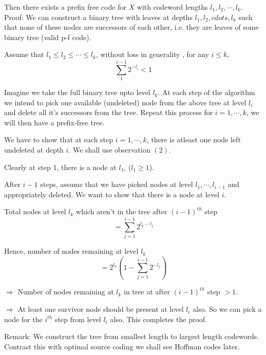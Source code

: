 \documentclass{article}
\begin{document}
 Then there exists a prefix free code for $X$ with codeword lengths $l_1 , l_2 , \cdots, l_k$.\\

 Proof: We can construct a binary tree with leaves at depths $l_1, l_2, cdots, l_k$ such that none of these nodes are successors of each other, i.e. they are leaves of some binary tree (valid p-f code).

 Assume that $l_1 \leq l_2 \leq \cdots \leq l_k$, without loss in generality    , for any $i \leq k$,
 \begin{equation}
     \sum_{1}^{i-1} 2^{-l_i} <1
 \end{equation}

Imagine we take the full binary tree upto level $l_k$. At each step of the algorithm we intend to pick one available (undeleted) node from the above tree at level $l_i$ and delete all it's successors from the tree. Repeat this process for $i=1, \cdots , k$, we will then have a prefix-free tree.

We have to show that at each step $i=1, \cdots, k$, there is atleast one node left undeleted at depth $i$. We shall use observation $(2)$.

Clearly at step 1, there is a node at $l_1$, ($l_1 \geq 1$).

After $i-1$ steps, assume that we have picked nodes at level $l_1, \cdots, l_{i-1}$ and appropriately deleted. We want to show that there is a node at level $i$.

Total nodes at level $l_k$ which aren't in the tree after $(i-1)^{th}$ step
$$ = \sum_{j=1}^{i-1} 2^{l_k -l_j}$$

Hence, number of nodes remaining at level $l_k$
$$ = 2^{l_k}(1- \sum_{j=1}^{i-1}2^{-l_j})$$

$\Rightarrow$ Number of nodes remaining at $l_k$ in tree at after $(i-1)^{th}$ step $>1$.

$\Rightarrow$ At least one  survivor node should be present at level $l_i$ also. So we can pick a node for the $i^{th}$ step from level $l_i$ also. This completes the proof.

Remark: We construct the tree from smallest length to largest length codewords. Contrast this with optimal source coding we shall see Hoffman codes later.

\subsection{}
\end{document}
